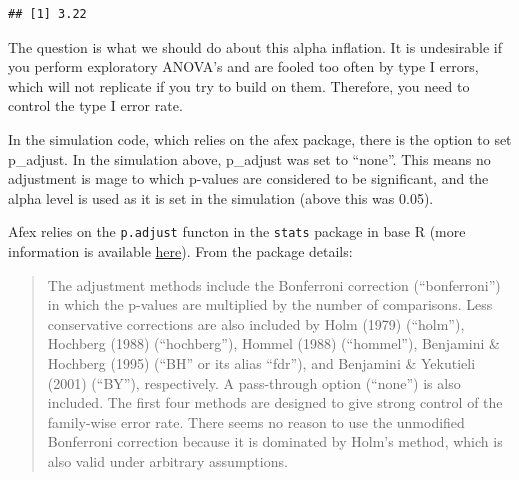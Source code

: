 \documentclass[]{book}
\newenvironment{Shaded}{\begin{snugshade}}{\end{snugshade}}
\newcommand{\ControlFlowTok}[1]{\textcolor[rgb]{0.13,0.29,0.53}{\textbf{#1}}}
\newcommand{\DecValTok}[1]{\textcolor[rgb]{0.00,0.00,0.81}{#1}}
\newcommand{\FloatTok}[1]{\textcolor[rgb]{0.00,0.00,0.81}{#1}}
\newcommand{\KeywordTok}[1]{\textcolor[rgb]{0.13,0.29,0.53}{\textbf{#1}}}
\newcommand{\NormalTok}[1]{#1}
\newcommand{\OperatorTok}[1]{\textcolor[rgb]{0.81,0.36,0.00}{\textbf{#1}}}
\newcommand{\StringTok}[1]{\textcolor[rgb]{0.31,0.60,0.02}{#1}}
\begin{document}
\begin{Shaded}
\end{Shaded}

\begin{verbatim}
## [1] 3.22
\end{verbatim}

The question is what we should do about this alpha inflation. It is undesirable if you perform exploratory ANOVA's and are fooled too often by type I errors, which will not replicate if you try to build on them. Therefore, you need to control the type I error rate.

In the simulation code, which relies on the afex package, there is the option to set p\_adjust. In the simulation above, p\_adjust was set to ``none''. This means no adjustment is mage to which p-values are considered to be significant, and the alpha level is used as it is set in the simulation (above this was 0.05).

Afex relies on the \texttt{p.adjust} functon in the \texttt{stats} package in base R (more information is available \href{https://www.rdocumentation.org/packages/stats/versions/3.1.1/topics/p.adjust}{here}). From the package details:

\begin{quote}
The adjustment methods include the Bonferroni correction (``bonferroni'') in which the p-values are multiplied by the number of comparisons. Less conservative corrections are also included by Holm (1979) (``holm''), Hochberg (1988) (``hochberg''), Hommel (1988) (``hommel''), Benjamini \& Hochberg (1995) (``BH'' or its alias ``fdr''), and Benjamini \& Yekutieli (2001) (``BY''), respectively. A pass-through option (``none'') is also included. The first four methods are designed to give strong control of the family-wise error rate. There seems no reason to use the unmodified Bonferroni correction because it is dominated by Holm's method, which is also valid under arbitrary assumptions.
\end{quote}
\end{document}
